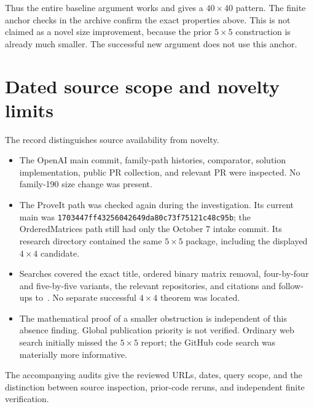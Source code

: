\documentclass[11pt,a4paper]{article}
\theoremstyle{remark}
\begin{document}
Thus the entire baseline argument works and gives a \(40\times40\)
pattern. The finite anchor checks in the archive confirm the exact
properties above. This is not claimed as a novel size improvement,
because the prior \(5\times5\) construction is already much smaller.
The successful new argument does not use this anchor.

\section{Dated source scope and novelty limits}
The record distinguishes source availability from novelty.
\begin{itemize}
\item The OpenAI main commit, family-path histories, comparator,
solution implementation, public PR collection, and relevant PR
were inspected. No family-190 size change was present.
\item The ProveIt path was checked again during the investigation.
Its current main was
\texttt{1703447ff43256042649da80c73f75121c48c95b};
the OrderedMatrices path still had only the October 7 intake
commit. Its research directory contained the same \(5\times5\)
package, including the displayed \(4\times4\) candidate.
\item Searches covered the exact title, ordered binary matrix
removal, four-by-four and five-by-five variants, the relevant
repositories, and citations and follow-ups to~\cite{ab}.
No separate successful \(4\times4\) theorem was located.
\item The mathematical proof of a smaller obstruction is independent
of this absence finding. Global publication priority is not verified.
Ordinary web search initially missed the \(5\times5\) report;
the GitHub code search was materially more informative.
\end{itemize}
The accompanying audits give the reviewed URLs, dates, query scope,
and the distinction between source inspection, prior-code reruns,
and independent finite verification.
\end{document}
